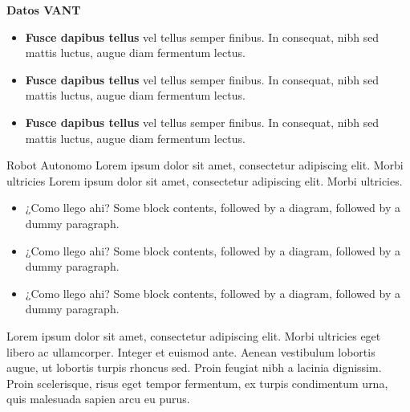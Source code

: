 \documentclass[final]{beamer}
\newlength{\colwidth}
\begin{document}
\begin{frame}[t]
\begin{columns}[t]
\begin{column}{\colwidth}
\begin{block}{\color{teal}\textbf{Datos VANT}}
    \begin{multicols}{3}
      \begin{itemize}
      \item \textbf{Fusce dapibus tellus} vel tellus semper finibus. In consequat, nibh sed mattis luctus, augue diam fermentum lectus.\cite{shannon1948communication}\\
      \item \textbf{Fusce dapibus tellus} vel tellus semper finibus. In consequat, nibh sed mattis luctus, augue diam fermentum lectus.\cite{otromas}\\
      \item \textbf{Fusce dapibus tellus} vel tellus semper finibus. In consequat, nibh sed mattis luctus, augue diam fermentum lectus.\cite{unomas}\\
      \end{itemize}
    \end{multicols}
  \end{block}
  
  \begin{block}{\color{teal}Robot Autonomo}
    Lorem ipsum dolor sit amet, consectetur adipiscing elit. Morbi ultricies Lorem ipsum dolor sit amet, consectetur adipiscing elit. Morbi ultricies.
    \begin{multicols}{2}
      \begin{itemize}
      \item ¿Como llego ahi?
        Some block contents, followed by a diagram, followed by a dummy paragraph.
      \item ¿Como llego ahi?
        Some block contents, followed by a diagram, followed by a dummy paragraph.
      \item ¿Como llego ahi?
        Some block contents, followed by a diagram, followed by a dummy paragraph.
      \end{itemize}
      Lorem ipsum dolor sit amet, consectetur adipiscing elit. Morbi ultricies
    eget libero ac ullamcorper. Integer et euismod ante. Aenean vestibulum
    lobortis augue, ut lobortis turpis rhoncus sed. Proin feugiat nibh a
    lacinia dignissim. Proin scelerisque, risus eget tempor fermentum, ex
    turpis condimentum urna, quis malesuada sapien arcu eu purus.
      

\end{multicols}
\end{block}
\end{column}
\end{columns}
\end{frame}
\end{document}
